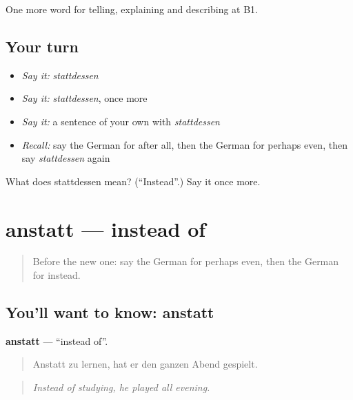 \begin{grammarlens}[title={What you've built}]
One more word for telling, explaining and describing at B1.
\end{grammarlens}

\subsection*{Your turn}
\begin{itemize}
\raggedright
  \item \emph{Say it:} \emph{stattdessen}
  \item \emph{Say it:} \emph{stattdessen}, once more
  \item \emph{Say it:} a sentence of your own with \emph{stattdessen}
  \item \emph{Recall:} say the German for after all, then the German for perhaps even, then say \emph{stattdessen} again
\end{itemize}

\begin{tcolorbox}[breakable,colback=teal!4,colframe=teal!35!black,title={Before you move on}]
What does stattdessen mean? (\textquotedblleft{}Instead\textquotedblright{}.) Say it once more.
\end{tcolorbox}
\section[anstatt]{anstatt — instead of}

\label{lesson:GE-C368-anstatt}



\begin{quote}
Before the new one: say the German for perhaps even, then the German for instead.
\end{quote}

\subsection*{You'll want to know: anstatt}
\textbf{anstatt} — \textquotedblleft{}instead of\textquotedblright{}.

\begin{quote}
Anstatt zu lernen, hat er den ganzen Abend gespielt.
\end{quote}

\begin{quote}
\emph{Instead of studying, he played all evening.}
\end{quote}

